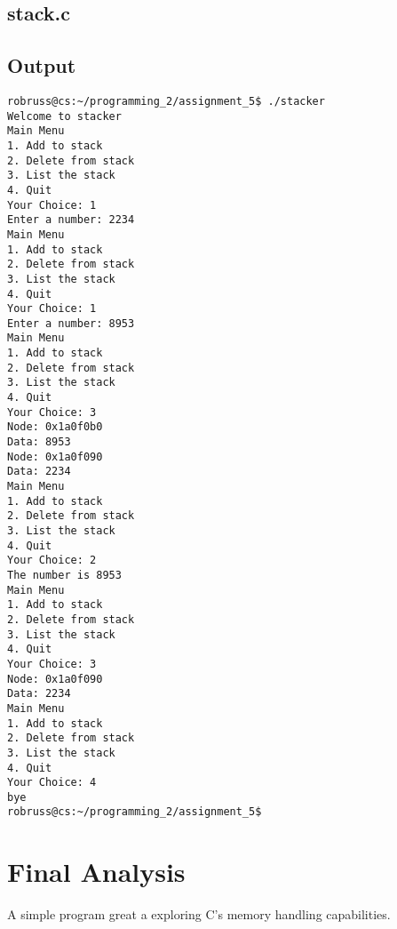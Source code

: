 \documentclass[letterpaper,oneside]{scrartcl}
\begin{document}
\subsection{stack.c}

\subsection{Output}
\begin{Verbatim}
robruss@cs:~/programming_2/assignment_5$ ./stacker                             
Welcome to stacker                                                             
Main Menu                                                                      
1. Add to stack                                                                
2. Delete from stack                                                           
3. List the stack                                                              
4. Quit                                                                        
Your Choice: 1                                                                 
Enter a number: 2234                                                           
Main Menu
1. Add to stack
2. Delete from stack
3. List the stack
4. Quit
Your Choice: 1
Enter a number: 8953
Main Menu
1. Add to stack
2. Delete from stack
3. List the stack
4. Quit
Your Choice: 3
Node: 0x1a0f0b0
Data: 8953
Node: 0x1a0f090
Data: 2234
Main Menu
1. Add to stack
2. Delete from stack
3. List the stack
4. Quit
Your Choice: 2
The number is 8953
Main Menu
1. Add to stack
2. Delete from stack
3. List the stack
4. Quit
Your Choice: 3
Node: 0x1a0f090
Data: 2234
Main Menu
1. Add to stack
2. Delete from stack
3. List the stack
4. Quit
Your Choice: 4
bye
robruss@cs:~/programming_2/assignment_5$
\end{Verbatim}

\section{Final Analysis}

A simple program great a exploring C's memory handling capabilities.
\end{document}
